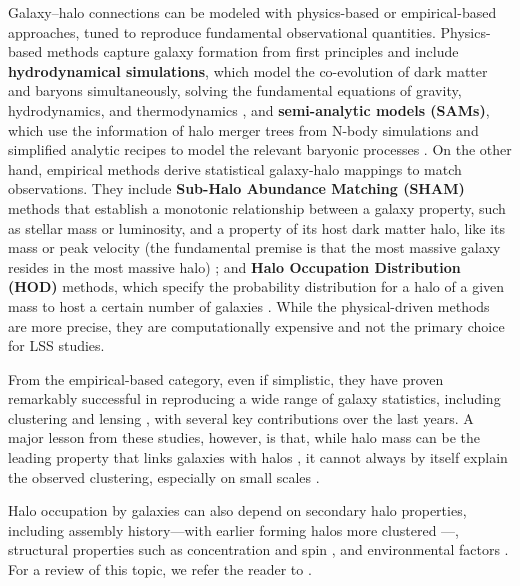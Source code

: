 \documentclass[]{aa} %
\begin{document}
Galaxy–halo connections can be modeled with physics-based or empirical-based approaches, tuned to reproduce fundamental observational quantities. Physics-based methods capture galaxy formation from first principles and include \textbf{hydrodynamical simulations}, which model the co-evolution of dark matter and baryons simultaneously, solving the fundamental equations of gravity, hydrodynamics, and thermodynamics  \citep{dubois2014,schaller2015,dolag2016,mccarthy2016bahamas,springel2018illustrisTNG,villaescusa2021camels,schaye2023flamingo}, 
and \textbf{semi-analytic models (SAMs)}, which use the information of halo merger trees from N-body simulations and simplified analytic recipes to model the relevant baryonic processes \citep{somerville2014,gabrielpillai2022,luciaperez2023,bower2006,behroozi2019universemachine,benson2012galacticus}. On the other hand, empirical methods derive statistical galaxy-halo mappings to match observations. They include \textbf{Sub-Halo Abundance Matching (SHAM)} methods that establish a monotonic relationship between a galaxy property, such as stellar mass or luminosity, and a property of its host dark matter halo, like its mass or peak velocity (the fundamental premise is that the most massive galaxy resides in the most massive halo) \citep{conroy2006,moster2010,behroozi2010,tacchella2013,moster2013,moster2018,tacchella2018}; and \textbf{Halo Occupation Distribution (HOD)} methods, which 
specify the probability distribution for a halo of a given mass to host a certain number of galaxies \citep{peacock2000,berlind2002,zheng2005,guo2015,rodriguez2015}. While the physical-driven methods are more precise, they are computationally expensive and not the primary choice for LSS studies. 

From the empirical-based category, even if simplistic, they have proven remarkably successful in reproducing a wide range of galaxy statistics, including clustering and lensing \citep{hearin2015dark}, 
with several key contributions over the last years. A major lesson from these studies, however, is that, while halo mass can be the leading property that links galaxies with halos \citep{white1978}, it cannot always by itself explain the observed clustering, especially on small scales \citep{yuan2021,yuan2022,Wu2024,Hadzhiyska2021,Paviot2024}. 

Halo occupation by galaxies can also depend on secondary halo properties, including assembly history---with earlier forming halos more clustered \citep{sheth2004,gao2005,wechsler2006,gao2007,dalal2008,angulo2008,li2008,faltenbacher2009,lazeyras2017,salcedo2018,han2019,sato2019,ramakrishnan2019,tucci2021,montero2021,balaguera2024}---, structural properties such as concentration and spin \citep{gao2007,faltenbacher2009,sato2019,montero2021}, and environmental factors \citep{kauffmann2004,hahn2006,blanton2006,abbas2007,Wu2024,pujol2017,paranjape2018,balaguera2024}. For a review of this topic, we refer the reader to \cite{wechsler&tinker2018}.
\end{document}

